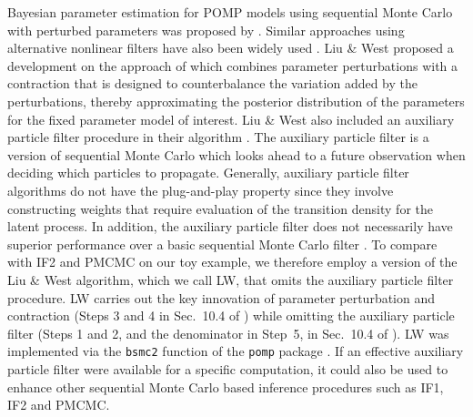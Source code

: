\documentclass[11pt]{article}
\begin{document}
Bayesian parameter estimation for POMP models using sequential Monte Carlo with perturbed parameters was proposed by \cite{kitagawa98}. 
Similar approaches using alternative nonlinear filters have also been widely used \cite{anderson79,wan00}.
Liu \& West \cite{janeliu01} proposed a development on the approach of \cite{kitagawa98} which combines parameter perturbations with a contraction that is designed to counterbalance the variation added by the perturbations, thereby approximating the posterior distribution of the parameters for the fixed parameter model of interest.
Liu \& West \cite{janeliu01} also included an auxiliary particle filter procedure  in their algorithm \cite{pitt99}.
The auxiliary particle filter is a version of sequential Monte Carlo which looks ahead to a future observation when deciding which particles to propagate.
Generally, auxiliary particle filter algorithms do not have the plug-and-play property \cite{breto09,he10} since they involve constructing weights that require evaluation of the transition density for the latent process.
In addition, the auxiliary particle filter does not necessarily have superior performance over a basic sequential Monte Carlo filter \cite{johansen08b}.
To compare with IF2 and PMCMC on our toy example, we therefore employ a version of the Liu \& West algorithm, which we call LW, that omits the auxiliary particle filter procedure.
LW carries out the key innovation of parameter perturbation and contraction (Steps 3 and 4 in Sec.~10.4 of \cite{janeliu01}) while omitting the auxiliary particle filter (Steps 1 and 2, and the denominator in Step~5, in Sec.~10.4 of \cite{janeliu01}).
LW was implemented via the \texttt{bsmc2} function of the \texttt{pomp} package \cite{pomp}.
If an effective auxiliary particle filter were available for a specific computation, it could also be used to enhance other sequential Monte Carlo based inference procedures such as IF1, IF2 and PMCMC.
\end{document}
